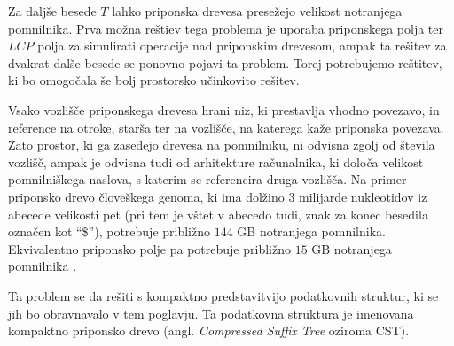 Za daljše besede $T$ lahko priponska drevesa presežejo velikost notranjega pomnilnika. Prva možna reštiev tega problema je uporaba priponskega polja ter $LCP$ polja za simulirati operacije nad priponskim drevesom, ampak ta rešitev za dvakrat dalše besede se ponovno pojavi ta problem. Torej potrebujemo reštitev, ki bo omogočala še bolj prostorsko učinkovito rešitev. 

Vsako vozlišče priponskega drevesa hrani niz, ki prestavlja vhodno povezavo, in reference na otroke, starša ter na vozlišče, na katerega kaže priponska povezava. Zato prostor, ki ga zasedejo drevesa na pomnilniku, ni odvisna zgolj od števila vozlišč, ampak je odvisna tudi od arhitekture računalnika, ki določa velikost pomnilniškega naslova, s katerim se referencira druga vozlišča. Na primer priponsko drevo človeškega genoma, ki ima dolžino 3 milijarde nukleotidov iz abecede velikosti pet (pri tem je vštet v abecedo tudi, znak za konec besedila označen kot \enquote{\$}), potrebuje približno $144$ GB notranjega pomnilnika. Ekvivalentno priponsko polje pa potrebuje približno $15$ GB notranjega pomnilnika \cite{GENOMEKNOWLEDGEHUB-2024-10-30}.

Ta problem se da rešiti s kompaktno predstavitvijo podatkovnih struktur, ki se jih bo obravnavalo v tem poglavju. Ta podatkovna struktura je imenovana kompaktno priponsko drevo (angl. \textit{Compressed Suffix Tree} oziroma CST).


